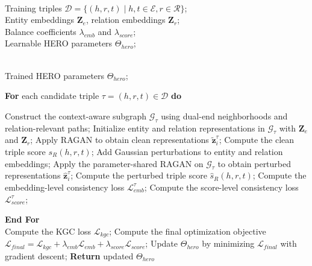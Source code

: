 \documentclass[pdflatex,sn-mathphys-num]{sn-jnl}
\begin{document}
\begin{algorithm}[t]
\caption{Robust Reasoning and Optimization Procedure of HERO}
\label{alg:hero_reasoning}
\begin{algorithmic}[1]

\REQUIRE \ \\
Training triples $\mathcal{D}=\{(h,r,t)\mid h,t\in \mathcal{E}, r\in \mathcal{R}\}$;\\
Entity embeddings $\mathbf{Z}_{e}$, relation embeddings $\mathbf{Z}_{r}$;\\
Balance coefficients $\lambda_{emb}$ and $\lambda_{score}$;\\
Learnable HERO parameters $\Theta_{hero}$;

\ENSURE \ \\
Trained HERO parameters $\Theta_{hero}$;

\STATE \textbf{For} {each candidate triple $\tau=(h,r,t)\in\mathcal{D}$} \textbf{do}

    \STATE \hspace{0.5cm} Construct the context-aware subgraph $\mathcal{G}_{\tau}$ using dual-end neighborhoods and relation-relevant paths;
    \STATE \hspace{0.5cm} Initialize entity and relation representations in $\mathcal{G}_{\tau}$ with $\mathbf{Z}_{e}$ and $\mathbf{Z}_{r}$;
    \STATE \hspace{0.5cm} Apply RAGAN to obtain clean representations $\widetilde{\mathbf{z}}_{i}^{\tau}$;
    \STATE \hspace{0.5cm} Compute the clean triple score $s_R(h,r,t)$;
    \STATE \hspace{0.5cm} Add Gaussian perturbations to entity and relation embeddings;
    \STATE \hspace{0.5cm} Apply the parameter-shared RAGAN on $\mathcal{G}_{\tau}$ to obtain perturbed representations $\widehat{\mathbf{z}}_{i}^{\tau}$;
    \STATE \hspace{0.5cm} Compute the perturbed triple score $\widehat{s}_R(h,r,t)$;
    \STATE \hspace{0.5cm} Compute the embedding-level consistency loss $\mathcal{L}_{emb}^{\tau}$;
    \STATE \hspace{0.5cm} Compute the score-level consistency loss $\mathcal{L}_{score}^{\tau}$;

\STATE \textbf{End For} \\

\STATE Compute the KGC loss $\mathcal{L}_{kgc}$;
\STATE Compute the final optimization objective 
$\mathcal{L}_{final}=\mathcal{L}_{kgc}+\lambda_{emb}\mathcal{L}_{emb}+\lambda_{score}\mathcal{L}_{score}$;
\STATE Update $\Theta_{hero}$ by minimizing $\mathcal{L}_{final}$ with gradient descent;
\STATE \textbf{Return} updated $\Theta_{hero}$

\end{algorithmic}
\end{algorithm}
\end{document}
